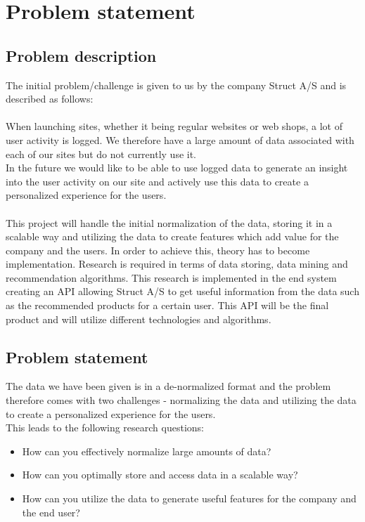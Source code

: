 
\chapter{Problem statement} %

\label{Chapter1} %


\section{Problem description}

The initial problem/challenge  is given to us by the company Struct A/S and is described as follows: \\\\
When launching sites, whether it being regular websites or web shops, a lot of user activity is logged. We therefore have a large amount of data associated with each of our sites but do not currently use it. \\
In the future we would like to be able to use logged data to generate an insight into the user activity on our site and actively use this data to create a personalized experience for the users. \\\\

This project will handle the initial normalization of the data, storing it in a scalable way and utilizing the data to create features which add value for the company and the users. In order to achieve this, theory has to become implementation. Research is required in terms of data storing, data mining and recommendation algorithms. This research is implemented in the end system creating an API allowing Struct A/S to get useful information from the data such as the recommended products for a certain user. This API will be the final product and will utilize different technologies and algorithms.





\section{Problem statement}
The data we have been given is in a de-normalized format and the problem therefore comes with two challenges - normalizing the data and utilizing the data to create a personalized experience for the users. \\
This leads to the following research questions:
\begin{itemize}
\item How can you effectively normalize large amounts of data?
\item How can you optimally store and access data in a scalable way?
\item How can you utilize the data to generate useful features for the company and the end user?
\end{itemize}
